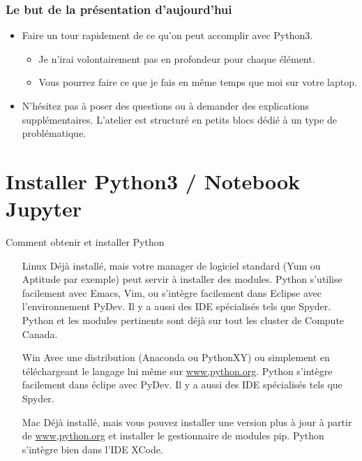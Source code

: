 \documentclass[]{beamer}
\begin{document}
\begin{frame}
\frametitle{Le but de la présentation d'aujourd'hui}
\begin{itemize}
\item Faire un tour rapidement de ce qu'on peut accomplir avec Python3.
\begin{itemize}
\item Je n'irai volontairement pas en profondeur pour chaque élément.
\item Vous pourrez faire ce que je fais en même temps que moi sur votre laptop.
\end{itemize}
\item N'hésitez pas à poser des questions ou à demander des explications supplémentaires. L'atelier est structuré en petits blocs dédié à un type de problématique.
\end{itemize}
\end{frame}

\section{Installer Python3  / Notebook Jupyter}
\begin{frame}[fragile]{Comment obtenir et installer Python}
\begin{itemize}
\item[Linux] Déjà installé, mais votre manager de logiciel standard (Yum ou Aptitude par exemple) peut servir à installer des modules. Python s'utilise facilement avec Emacs, Vim, ou s'intègre facilement dans Eclipse avec l'environnement PyDev. Il y a aussi des IDE spécialisés tels que Spyder. Python et les modules pertinents sont déjà sur tout les cluster de Compute Canada.
\item[Win] Avec une distribution (Anaconda ou PythonXY) ou simplement en téléchargeant le langage lui même sur \url{www,python.org}. Python s'intègre facilement dans éclipe avec PyDev. Il y a aussi des IDE spécialisés tels que Spyder. 
\item[Mac] Déjà installé, mais vous pouvez installer une version plus à jour à partir de \url{www,python.org} et installer le gestionnaire de modules pip. Python s'intègre bien dans l'IDE XCode.
\end{itemize}
\end{frame}
\end{document}
